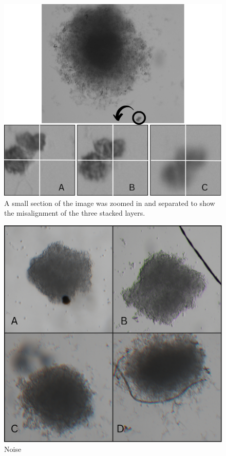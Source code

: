  \begin{figure}[H]
  \centering
  \includegraphics[scale=0.25]{figures/posi.png} 
  \caption{A small section of the image was zoomed in and separated to show the misalignment of the three stacked layers.}
  \label{fig:Misalignment}
\end{figure}
\begin{figure}[H]
  \centering
  \includegraphics[scale=0.2]{figures/noise.png} 
  \caption{Noise}
  \label{fig:noise}
\end{figure}

